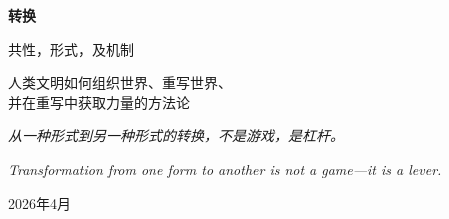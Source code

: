 \thispagestyle{empty}
\begin{center}
\vspace*{5cm}

{\fontsize{36}{44}\selectfont\bfseries 转换}

\vspace{1cm}

{\fontsize{24}{30}\selectfont 共性，形式，及机制}

\vspace{2cm}

{\large 人类文明如何组织世界、重写世界、\\并在重写中获取力量的方法论}

\vspace{2cm}

{\itshape 从一种形式到另一种形式的转换，不是游戏，是杠杆。}

\vspace{0.3cm}

{\itshape\small Transformation from one form to another is not a game---it is a lever.}

\vspace{2cm}

{\Large 2026年4月}

\vspace{\fill}
\end{center}
\newpage

